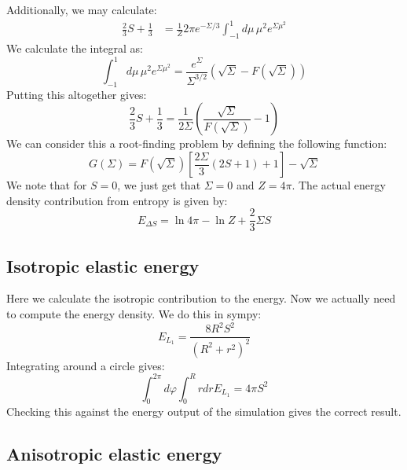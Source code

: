 \documentclass[reqno]{article}
\begin{document}
Additionally, we may calculate:
\begin{equation}
\begin{split}
    \frac23 S + \frac13
    &=
    \frac{1}{Z} 2 \pi e^{-\Sigma / 3} \int_{-1}^1 d\mu \, \mu^2 e^{\Sigma \mu^2} 
\end{split}
\end{equation}
We calculate the integral as:
\begin{equation}
    \int_{-1}^1 d\mu \, \mu^2 e^{\Sigma \mu^2}
    =
    \frac{e^\Sigma}{\Sigma^{3/2}} \left( \sqrt{\Sigma} - F \left(\sqrt{\Sigma}\right) \right)
\end{equation}
Putting this altogether gives:
\begin{equation}
    \frac23 S + \frac13
    =
    \frac{1}{2 \Sigma} \left( \frac{\sqrt{\Sigma}}{F \left( \sqrt{\Sigma} \right)} - 1 \right)
\end{equation}
We can consider this a root-finding problem by defining the following function:
\begin{equation}
    G(\Sigma)
    =
    F \left( \sqrt{\Sigma} \right) \left[ \frac{2 \Sigma}{3} \left(2S + 1 \right) + 1 \right] - \sqrt{\Sigma}
\end{equation}
We note that for $S = 0$, we just get that $\Sigma = 0$ and $Z = 4\pi$.
The actual energy density contribution from entropy is given by:
\begin{equation}
    E_{\Delta S}
    =
    \ln 4 \pi
    - \ln Z
    + \frac23 \Sigma S
\end{equation}

\subsection{Isotropic elastic energy}

Here we calculate the isotropic contribution to the energy.
Now we actually need to compute the energy density.
We do this in sympy:
\begin{equation}
    E_{L_1}
    =
    \frac{8 R^{2} S^{2}}{\left(R^{2} + r^{2}\right)^{2}}
\end{equation}
Integrating around a circle gives:
\begin{equation}
    \int_0^{2\pi} d \varphi \int_0^R r dr E_{L_1}
    =
    4 \pi S^2
\end{equation}
Checking this against the energy output of the simulation gives the correct result.

\subsection{Anisotropic elastic energy}
\end{document}
